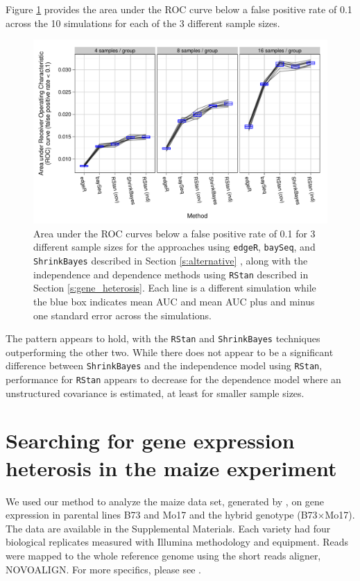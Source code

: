 \documentclass[useAMS,usenatbib,referee]{biom}
\newcommand{\RStan}{{\tt RStan}}
\newcommand{\edgeR}{{\tt edgeR}}
\newcommand{\ShrinkBayes}{{\tt ShrinkBayes}}
\begin{document}
Figure \ref{f:auc} provides the area under the ROC curve below a false positive rate of 0.1 across the 10 simulations for each of the 3 different sample sizes. 
\begin{figure}
\centerline{\includegraphics[width=\textwidth]{auc-facet-TRUE}}
\caption{Area under the ROC curves below a false positive rate of 0.1 for 3 different sample sizes for the approaches using \edgeR{}, {\tt baySeq},  and \ShrinkBayes{} described in Section \ref{s:alternative} , along with the independence and dependence methods using \RStan{} described in Section \ref{s:gene_heterosis}. Each line is a different simulation while the blue box indicates mean AUC and mean AUC plus and minus one standard error across the simulations.}
\label{f:auc}
\end{figure}
The pattern appears to hold, with the \RStan{} and \ShrinkBayes{} techniques outperforming the other two. While there does not appear to be a significant difference between \ShrinkBayes{} and the independence model using \RStan{}, performance for \RStan{} appears to decrease for the dependence model where an unstructured covariance is estimated, at least for smaller sample sizes.



\section{Searching for gene expression heterosis in the maize experiment}
\label{s:maize}

We used our method to analyze the maize data set, generated by \cite{paschold2012complementation}, on gene expression in parental lines B73 and Mo17 and the hybrid genotype (B73$\times$Mo17). The data are available in the Supplemental Materials. Each variety had four biological replicates measured with Illumina methodology and equipment. Reads were mapped to the whole reference genome using the short reads aligner, NOVOALIGN. For more specifics, please see \cite{paschold2012complementation}. 
\end{document}
